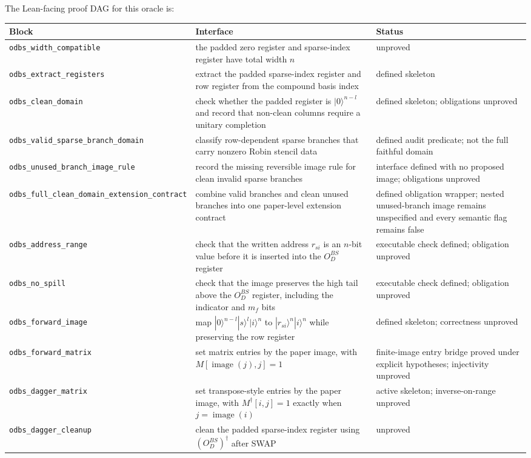 The Lean-facing proof DAG for this oracle is:
\begin{center}
\begin{tabular}{p{}p{}p{}}
\hline
Block & Interface & Status \\
\hline
\texttt{odbs\_width\_compatible} &
the padded zero register and sparse-index register have total width $n$ &
unproved \\
\texttt{odbs\_extract\_registers} &
extract the padded sparse-index register and row register from the compound
basis index &
defined skeleton \\
\texttt{odbs\_clean\_domain} &
check whether the padded register is $|0\rangle^{n-l}$ and record that
non-clean columns require a unitary completion &
defined skeleton; obligations unproved \\
\texttt{odbs\_valid\_sparse\_branch\_domain} &
classify row-dependent sparse branches that carry nonzero Robin stencil data &
defined audit predicate; not the full faithful domain \\
\texttt{odbs\_unused\_branch\_image\_rule} &
record the missing reversible image rule for clean invalid sparse branches &
interface defined with no proposed image; obligations unproved \\
\texttt{odbs\_full\_clean\_domain\_extension\_contract} &
combine valid branches and clean unused branches into one paper-level extension
contract &
defined obligation wrapper; nested unused-branch image remains unspecified and
every semantic flag remains false \\
\texttt{odbs\_address\_range} &
check that the written address $r_{si}$ is an $n$-bit value before it is
inserted into the $O_D^{BS}$ register &
executable check defined; obligation unproved \\
\texttt{odbs\_no\_spill} &
check that the image preserves the high tail above the $O_D^{BS}$ register,
including the indicator and $m_f$ bits &
executable check defined; obligation unproved \\
\texttt{odbs\_forward\_image} &
map $|0\rangle^{n-l}|s\rangle^l|i\rangle^n$ to
$|r_{si}\rangle^n|i\rangle^n$ while preserving the row register &
defined skeleton; correctness unproved \\
\texttt{odbs\_forward\_matrix} &
set matrix entries by the paper image, with
$M[\operatorname{image}(j),j]=1$ &
finite-image entry bridge proved under explicit hypotheses; injectivity unproved \\
\texttt{odbs\_dagger\_matrix} &
set transpose-style entries by the paper image, with
$M^\dagger[i,j]=1$ exactly when $j=\operatorname{image}(i)$ &
active skeleton; inverse-on-range unproved \\
\texttt{odbs\_dagger\_cleanup} &
clean the padded sparse-index register using $(O_D^{BS})^\dagger$ after SWAP &
unproved \\
\hline
\end{tabular}
\end{center}

